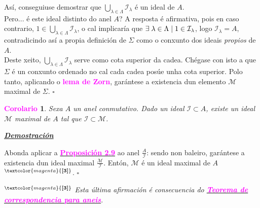 \documentclass[twoside]{report}
\newcommand{\magbf}[1]{\textcolor{magenta}{\textbf{#1}}} %
\theoremstyle{mystyle}
\newtheorem{cor}{\magbf{Corolario}}[chapter]
\newenvironment{corollary}
{\begin{mdframed}[linecolor = magenta,backgroundcolor = classicrose, linewidth = 2mm]\begin{cor}}
{\end{cor}\end{mdframed}}
\begin{document}
\noindent Así, conseguiuse demostrar que $\underset{\lambda \in \Lambda}{\bigcup}\mathcal{I_{\lambda}}$ é un ideal de $A$.\\

\noindent Pero... é este ideal distinto do anel $A$? A resposta é afirmativa, pois en caso contrario, $1 \in \underset{\lambda \in \Lambda}{\bigcup}\mathcal{I_{\lambda}}$, o cal implicaría que $\exists \hspace{1mm} \lambda \in \Lambda \hspace{1mm} | \hspace{1mm} 1 \in \mathcal{I}_{\lambda}$, logo $\mathcal{I}_{\lambda} = A$, contradicindo así a propia definición de $\Sigma$ como o conxunto dos ideais \textit{propios} de $A$.\\

\noindent Deste xeito, $\underset{\lambda \in \Lambda}{\bigcup}\mathcal{I_{\lambda}}$ serve como cota superior da cadea. Chégase con isto a que $\Sigma$ é un conxunto ordenado no cal cada cadea posúe unha cota superior. Polo tanto, aplicando o \magbf{lema de Zorn}, garántese a existencia dun elemento $\mathcal{M}$ maximal de $\Sigma$. $\square$\\

\vspace{3mm}

\begin{corollary} \label{cor2.2}
Sexa $A$ un anel conmutativo. Dado un ideal $\mathcal{I} \subset A$, existe un ideal $\mathcal{M}$ maximal de $A$ tal que $\mathcal{I \subset M}$.
\end{corollary}

\noindent \textbf{\textit{\underline{Demostración}}}

\vspace{2mm}

\noindent Abonda aplicar a \hyperref[prop2.9]{\magbf{Proposición 2.9}} ao anel $\displaystyle \frac{A}{\mathcal{I}}$: sendo non baleiro, garántese a existencia dun ideal maximal $\displaystyle \frac{\mathcal{M}}{\mathcal{I}}$. Entón, $\mathcal{M}$ é un ideal maximal de $A$ $^{\magbf{[3]}}$. $\square$\\

\vspace{3mm}

\noindent $^{\magbf{[3]}}$ \textit{Esta última afirmación é consecuencia do \hyperref[th2.4]{\magbf{Teorema de correspondencia para aneis}}}.\\

\vspace{3mm}
\end{document}
